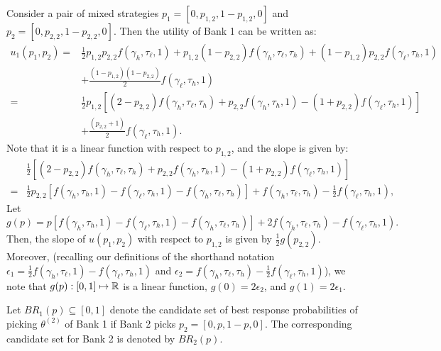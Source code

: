 \noindent Consider a pair of mixed strategies $p_1=[0,p_{1,2},1-p_{1,2},0]$ and $p_2=[0,p_{2,2},1-p_{2,2},0]$. Then the utility of Bank 1 can be written as: 
\begin{equation}
    \begin{split}
    \label{eqn:u13123123}
u_{1}(p_1,p_2) = {} & \frac{1}{2} p_{1,2}p_{2,2} f(\gamma_{h}, \tau_{\ell}, 1) + p_{1,2}(1-p_{2,2})f(\gamma_{h},\tau_{\ell},\tau_{h})+ (1-p_{1,2})p_{2,2}f(\gamma_{\ell},\tau_h,1)\\
{} & + \frac{(1-p_{1,2})(1-p_{2,2})}{2}f(\gamma_{\ell},\tau_{h},1)\\       = {} & \frac{1}{2}p_{1,2}\left[(2-p_{2,2})f(\gamma_{h},\tau_{\ell},\tau_{h}) + p_{2,2}f(\gamma_{h},\tau_{h},1) -(1+p_{2,2})f(\gamma_{\ell},\tau_{h},1) \right] \\
{} & + \frac{(p_{2,2}+1)}{2}f(\gamma_{\ell},\tau_{h},1).
    \end{split}
\end{equation}
Note that it is a linear function with respect to $p_{1,2}$, and the slope is given by:
\begin{equation*}
    \begin{split}
        {} & \frac{1}{2} \left[(2-p_{2,2})f(\gamma_{h},\tau_{\ell},\tau_{h}) + p_{2,2}f(\gamma_{h},\tau_{h},1) -(1+p_{2,2})f(\gamma_{\ell},\tau_{h},1)\right]\\
        = {} & \frac{1}{2} p_{2,2}[f(\gamma_{h},\tau_{h},1)-f(\gamma_{\ell},\tau_{h},1)-f(\gamma_{h},\tau_{\ell},\tau_{h})] + f(\gamma_{h},\tau_{\ell},\tau_{h}) - \frac{1}{2} f(\gamma_{\ell},\tau_{h},1),
    \end{split}
\end{equation*}
Let 
\begin{equation}
\label{eqn:def-of-g(p)}
g(p)=p[f(\gamma_{h},\tau_{h},1)-f(\gamma_{\ell},\tau_{h},1)-f(\gamma_{h},\tau_{\ell},\tau_{h})] + 2f(\gamma_{h},\tau_{\ell},\tau_{h}) - f(\gamma_{\ell},\tau_{h},1).
\end{equation}
Then, the slope of $u(p_1,p_2)$ with respect to $p_{1,2}$ is given by $\frac{1}{2} g(p_{2,2})$.
Moreover, (recalling our definitions of the shorthand notation $\epsilon_1 = \frac{1}{2} f(\gamma_h, \tau_{\ell},1) - f(\gamma_{\ell},\tau_h, 1)$ and $\epsilon_2 = f(\gamma_h, \tau_{\ell}, \tau_h) - \frac{1}{2} f(\gamma_{\ell},\tau_h, 1)$), we note that $g(p):[0,1]\mapsto \mathbb{R}$ is a linear function, $g(0)=2\epsilon_2$, and $g(1)=2\epsilon_1$.
\\
\noindent 

Let $BR_1(p) \subseteq [0,1]$ denote the candidate set of best response probabilities of picking $\theta^{(2)}$ of Bank 1 if Bank 2 picks $p_2=[0,p,1-p,0]$. 
The corresponding candidate set for Bank 2 is denoted by $BR_2(p)$.

